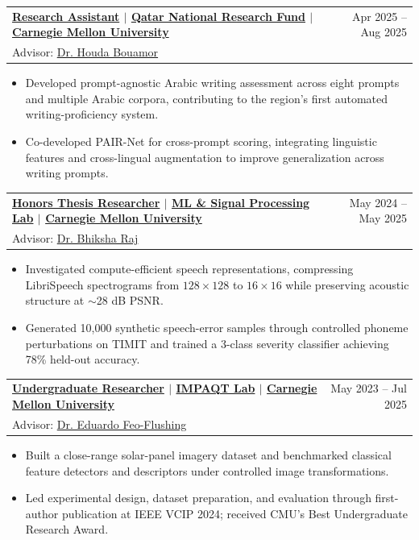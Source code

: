 \documentclass[letterpaper,10pt]{article}
\makeatletter
\newcommand{\resumeSubheading}[4]{
  \vspace{0pt}\item
    \begin{tabular*}{0.98\textwidth}[t]{l@{\extracolsep{\fill}}r}
      \textbf{#1} & {\small\color{dategray}#2} \\
      {\small#3} & {\small\color{dategray}#4} \\
    \end{tabular*}
    \vspace{-3pt}
}
\newcommand{\resumeItemListStart}{
  \begin{itemize}[
    leftmargin=0.15in,
    label=\raisebox{0.2ex}{\tiny$\bullet$},
    labelsep=0.4em,
    itemsep=1.5pt,
    parsep=0pt,
    topsep=2pt
  ]
}
\newcommand{\resumeItemListEnd}{\end{itemize}\vspace{-1pt}}
\newcommand{\resumelink}[2]{\href{#1}{\textcolor{accent}{#2}}}
\makeatother
\begin{document}
  \resumeSubheading
    {\resumelink{https://ema-ans.github.io/projects/arabic-writing-assessment.html}{Research Assistant} $|$ \resumelink{https://tdv.motc.gov.qa/Research-and-Development/Qatar-National-Research-Fund}{Qatar National Research Fund} $|$ \resumelink{https://www.cmu.edu/}{Carnegie Mellon University}}{Apr 2025 -- Aug 2025}
    {Advisor: \resumelink{https://scholars.cmu.edu/1839-houda-bouamor}{Dr. Houda Bouamor}}{}
    \resumeItemListStart
      \item Developed prompt-agnostic Arabic writing assessment across eight prompts and multiple Arabic corpora, contributing to the region's first automated writing-proficiency system.
      \item Co-developed PAIR-Net for cross-prompt scoring, integrating linguistic features and cross-lingual augmentation to improve generalization across writing prompts.
    \resumeItemListEnd

  \resumeSubheading
    {\resumelink{https://ema-ans.github.io/projects/speech-audio-pretraining.html}{Honors Thesis Researcher} $|$ \resumelink{https://mlsp.cs.cmu.edu/}{ML \& Signal Processing Lab} $|$ \resumelink{https://www.cmu.edu/}{Carnegie Mellon University}}{May 2024 -- May 2025}
    {Advisor: \resumelink{https://lti.cmu.edu/people/faculty/raj-bhiksha.html}{Dr. Bhiksha Raj}}{}
    \resumeItemListStart
      \item Investigated compute-efficient speech representations, compressing LibriSpeech spectrograms from $128 \times 128$ to $16 \times 16$ while preserving acoustic structure at $\sim$28 dB PSNR.
      \item Generated 10,000 synthetic speech-error samples through controlled phoneme perturbations on TIMIT and trained a 3-class severity classifier achieving 78\% held-out accuracy.
    \resumeItemListEnd

  \resumeSubheading
    {\resumelink{https://ema-ans.github.io/projects/thermal-solar-vision.html}{Undergraduate Researcher} $|$ \resumelink{https://cmu-impactlab.org/}{IMPAQT Lab} $|$ \resumelink{https://www.cmu.edu/}{Carnegie Mellon University}}{May 2023 -- Jul 2025}
    {Advisor: \resumelink{https://www.efeoflushing.com/}{Dr. Eduardo Feo-Flushing}}{}
    \resumeItemListStart
      \item Built a close-range solar-panel imagery dataset and benchmarked classical feature detectors and descriptors under controlled image transformations.
      \item Led experimental design, dataset preparation, and evaluation through first-author publication at IEEE VCIP 2024; received CMU's Best Undergraduate Research Award.
    \resumeItemListEnd
\end{document}
